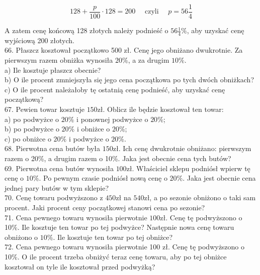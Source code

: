 \documentclass[10pt]{article}
\begin{document}
\[
128+\frac{p}{100} \cdot 128=200 \quad \text { czyli } \quad p=56 \frac{1}{4}
\]

A zatem cenę końcową 128 złotych należy podnieść o \(56 \frac{1}{4} \%\), aby uzyskać cenę wyjściową 200 złotych.\\
66. Płaszcz kosztował początkowo 500 zł. Cenę jego obniżano dwukrotnie. Za pierwszym razem obniżka wynosiła \(20 \%\), a za drugim \(10 \%\).\\
a) Ile kosztuje płaszcz obecnie?\\
b) O ile procent zmniejszyła się jego cena początkowa po tych dwóch obniżkach?\\
c) O ile procent należałoby tę ostatnią cenę podnieść, aby uzyskać cenę początkową?\\
67. Pewien towar kosztuje \(150 \mathrm{zł}\). Oblicz ile będzie kosztował ten towar:\\
a) po podwyżce o \(20 \%\) i ponownej podwyżce o \(20 \%\);\\
b) po podwyżce o \(20 \%\) i obniżce o \(20 \%\);\\
c) po obniżce o \(20 \%\) i podwyżce o \(20 \%\).\\
68. Pierwotna cena butów była \(150 \mathrm{zł}\). Ich cenę dwukrotnie obniżano: pierwszym razem o 20\%, a drugim razem o 10\%. Jaka jest obecnie cena tych butów?\\
69. Pierwotna cena butów wynosiła \(100 \mathrm{zł}\). Właściciel sklepu podniósł wpierw tę cenę o \(10 \%\). Po pewnym czasie podniósł nową cenę o \(20 \%\). Jaka jest obecnie cena jednej pary butów w tym sklepie?\\
70. Cenę towaru podwyższono z \(450 \mathrm{zł}\) na \(540 \mathrm{zł}\), a po sezonie obniżono o taki sam procent. Jaki procent ceny początkowej stanowi cena po sezonie?\\
71. Cena pewnego towaru wynosiła pierwotnie \(100 \mathrm{zł}\). Cenę tę podwyższono o 10\%. Ile kosztuje ten towar po tej podwyżce? Następnie nowa cenę towaru obniżono o \(10 \%\). Ile kosztuje ten towar po tej obniżce?\\
72. Cena pewnego towaru wynosiła pierwotnie 100 zł. Cenę tę podwyższono o 10\%. O ile procent trzeba obniżyć teraz cenę towaru, aby po tej obniżce kosztował on tyle ile kosztował przed podwyżką?
\end{document}
